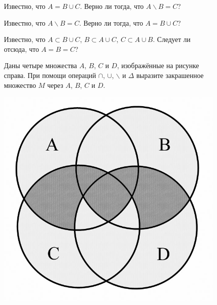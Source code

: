 {\setlength{\intextsep}{2pt}
\begin{figure}[h]
\begin{minipage}{0.8\linewidth}\setlength{\parindent}{1.5em}
\begin{thm}
Известно, что $A = B \cup C$. Верно ли тогда, что $A \backslash B = C$?
\end{thm}

\begin{thm}
Известно, что $A \backslash B = C$. Верно ли тогда, что $A = B \cup C$?
\end{thm}

\begin{thm}
Известно, что $A \subset B \cup C$, $B \subset A \cup C$, $C \subset A \cup B$. Следует ли отсюда, что $A = B = C$?
\end{thm}
    \begin{thm}
    Даны четыре множества $A$, $B$, $C$ и $D$, изображённые на рисунке справа. При помощи операций $\cap$, $\cup$, $\backslash$ и $\Delta$ выразите закрашенное множество $M$ через $A$, $B$, $C$ и $D$.\footnotemark
    \end{thm}
\end{minipage}
\hfill
\begin{minipage}{0.17\linewidth}
    \includegraphics[width=0.9\columnwidth]{img/euler3.png}
\end{minipage}
\end{figure}}

